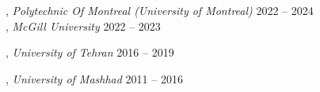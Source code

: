 
, \textit{Polytechnic Of Montreal (University of Montreal) }	\hfill 2022 -- 2024\\
, \textit{McGill University} \hfill	2022 -- 2023


, \textit{University of Tehran} \hfill	2016 -- 2019

, \textit{University of Mashhad} 
\hfill	2011 -- 2016




